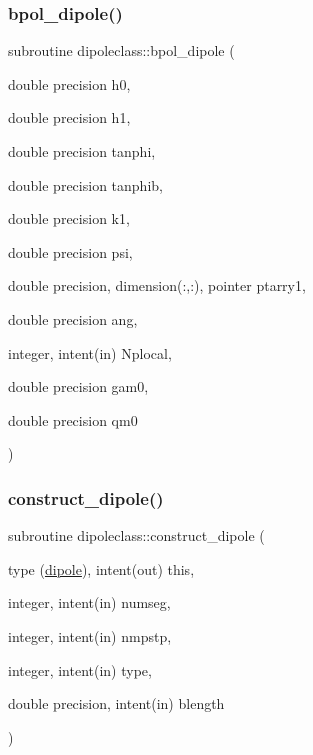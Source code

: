 \subsubsection{\texorpdfstring{bpol\_dipole()}{bpol\_dipole()}}
{\footnotesize\ttfamily subroutine dipoleclass\+::bpol\+\_\+dipole (\begin{DoxyParamCaption}\item[{double precision}]{h0,  }\item[{double precision}]{h1,  }\item[{double precision}]{tanphi,  }\item[{double precision}]{tanphib,  }\item[{double precision}]{k1,  }\item[{double precision}]{psi,  }\item[{double precision, dimension(\+:,\+:), pointer}]{ptarry1,  }\item[{double precision}]{ang,  }\item[{integer, intent(in)}]{Nplocal,  }\item[{double precision}]{gam0,  }\item[{double precision}]{qm0 }\end{DoxyParamCaption})}

\mbox{\label{namespacedipoleclass_ad926e6953a9110fb9662f9d75aec0578}} 
\subsubsection{\texorpdfstring{construct\_dipole()}{construct\_dipole()}}
{\footnotesize\ttfamily subroutine dipoleclass\+::construct\+\_\+dipole (\begin{DoxyParamCaption}\item[{type (\mbox{\hyperlink{namespacedipoleclass_structdipoleclass_1_1dipole}{dipole}}), intent(out)}]{this,  }\item[{integer, intent(in)}]{numseg,  }\item[{integer, intent(in)}]{nmpstp,  }\item[{integer, intent(in)}]{type,  }\item[{double precision, intent(in)}]{blength }\end{DoxyParamCaption})}

\mbox{\label{namespacedipoleclass_ab0dd1e8b5ca921939ce0d97f0bd817ee}} 
